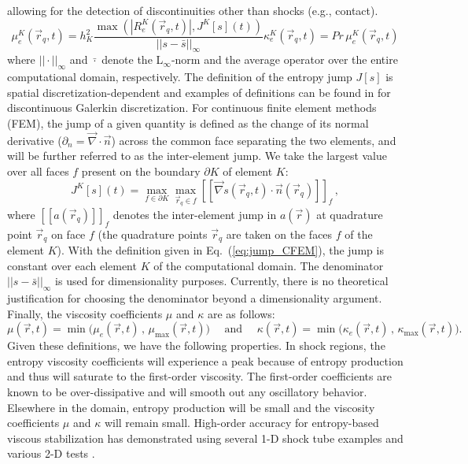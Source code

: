\documentclass[preprint,10pt]{elsarticle}
\newcommand{\grad}{\vec{\nabla}}
\newcommand{\jmp}[1]{[\![#1]\!]}                     %
\newcommand{\resi}{R_e}
\newcommand{\eqt}[1]{Eq.~(\ref{#1})}                     %
\begin{document}
allowing for the detection of discontinuities other than shocks (e.g., contact).
%
\begin{subequations}
\label{eq:ent_visc_coeff}
\begin{equation}
\mu^K_e(\vec{r}_q,t) =  h_K^2 \frac{\max\left( | \resi^K(\vec{r}_q,t) |, J^K[s](t) \right)}{|| s - \bar{s} ||_\infty}  
\end{equation}
\begin{equation}
\kappa^K_e(\vec{r}_q,t) = Pr \, \mu^K_e(\vec{r}_q,t)
\end{equation}
\end{subequations}
%
where $|| \cdot ||_\infty$ and $\bar{\cdot}$ denote the L$_\infty$-norm and the average operator over the entire computational domain, respectively. The definition of the entropy jump $J[s]$ is spatial discretization-dependent and examples of definitions can be found in \cite{valentin} for discontinuous Galerkin discretization. For continuous finite element methods (FEM), the jump of a given quantity is defined as the change of its normal derivative ($\partial_n = \grad \cdot \vec{n}$) across the common face separating the two elements, and will be further referred to as the inter-element jump. We take the largest value over all faces $f$ present on the boundary $\partial K$ of element $K$:
%
\begin{equation}
\label{eq:jump_CFEM}
J^K[s](t) = \max_{f\in\partial K}  \max_{\vec{r}_q \in f} \jmp{\grad s(\vec{r}_q,t) \cdot \vec{n}(\vec{r}_q) }_f \, ,
\end{equation}
%
where $\jmp{a(\vec{r}_q)}_f$ denotes the inter-element jump in $a(\vec{r})$ at quadrature point $\vec{r}_q$ on face $f$ (the quadrature points $\vec{r}_q$ are taken on the faces $f$ of the element $K$). With the definition given in \eqt{eq:jump_CFEM}, the jump is constant over each element $K$ of the computational domain. 
The denominator $|| s - \bar{s} ||_\infty$ is used for dimensionality purposes.
Currently, there is no theoretical justification for choosing the denominator beyond a dimensionality argument. 
Finally, the viscosity coefficients $\mu$ and $\kappa$ are as follows:
%
\begin{equation}
\mu(\vec{r},t)    = \min\Big( \mu_e(\vec{r},t)   \,,\, \mu_{\max}(\vec{r},t)    \Big) 
\quad \text{ and } \quad 
\kappa(\vec{r},t) = \min\Big( \kappa_e(\vec{r},t)\,,\, \kappa_{\max}(\vec{r},t) \Big).
\end{equation}
%
Given these definitions, we have the following properties.
In shock regions, the entropy viscosity coefficients will experience a peak because of entropy production and thus will saturate to the first-order viscosity. The first-order coefficients are known to be over-dissipative and will smooth out any oscillatory behavior. Elsewhere in the domain, entropy production will be small and the viscosity coefficients $\mu$ and $\kappa$ will remain small. %
High-order accuracy for entropy-based viscous stabilization has demonstrated using several 1-D shock tube examples and various 2-D tests \cite{jlg1, jlg2, valentin}.
\end{document}
